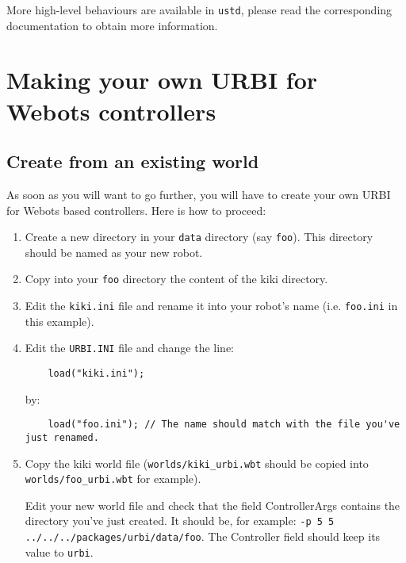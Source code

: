 More high-level behaviours are available in \nolinkurl{ustd}, please
read the corresponding documentation to obtain more information.



\section{Making your own URBI for Webots controllers}
\label{webots.own}%

\subsection{Create from an existing world}
\label{webots.own.create}%

     As soon as you will want to go further, you will have to create your own
    URBI for Webots based controllers. Here is how to proceed:

\begin{enumerate}

\item      Create a new directory in your \nolinkurl{data} directory
     (say \nolinkurl{foo}). This directory should be named as your
     new robot.



\item      Copy into your \nolinkurl{foo} directory the content
     of the kiki directory.



\item     Edit the \nolinkurl{kiki.ini} file and rename it into your
    robot's name (i.e. \nolinkurl{foo.ini} in this example).



\item     Edit the \nolinkurl{URBI.INI} file and change the line:


\begin{lstlisting}
    load("kiki.ini");
\end{lstlisting}

by:

\begin{lstlisting}
    load("foo.ini"); // The name should match with the file you've just renamed.
\end{lstlisting}




\item Copy the kiki world file (\nolinkurl{worlds/kiki_urbi.wbt}
  should be copied into \nolinkurl{worlds/foo_urbi.wbt} for example).


  Edit your new world file and check that the field ControllerArgs
  contains the directory you've just created. It should be, for
  example: \texttt{-{}\-p 5 5
    .\-.\-/\-.\-.\-/\-.\-.\-/\-p\-a\-c\-k\-a\-g\-e\-s\-/\-u\-r\-b\-i\-/\-d\-a\-t\-a\-/\-f\-o\-o}.
  The Controller field should keep its value to \texttt{u\-r\-b\-i}.


\end{enumerate}

